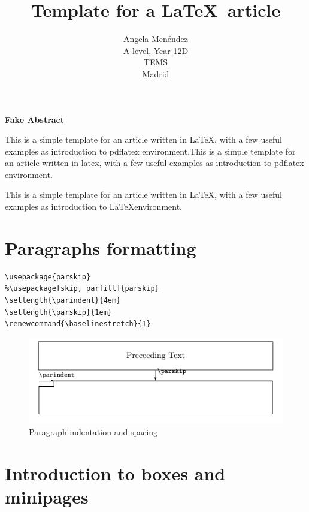 \documentclass[12pt,a4paper]{article}
\title{Template for a \LaTeX\ article}
\author{Angela Menéndez\\
  \small A-level, Year 12D\\
  \small TEMS\\
  \small Madrid
}
\theoremstyle{definition}
\theoremstyle{remark}
\begin{document}
\maketitle




\bigskip 
\begin{center}
\textbf{Fake Abstract}
\end{center}
This is a simple template for an article written in \LaTeX, with a few useful examples as introduction to pdflatex environment.This is a simple template for an article written in latex, with a few useful examples as introduction to pdflatex environment.

This is a simple template for an article written in \LaTeX, with a few useful examples as introduction to \LaTeX environment.

\newpage
\tableofcontents

\newpage
\section{Paragraphs formatting}\label{sec:par_formatting}
\begin{verbatim}
\usepackage{parskip}
%\usepackage[skip, parfill]{parskip}
\setlength{\parindent}{4em}
\setlength{\parskip}{1em}
\renewcommand{\baselinestretch}{1}
\end{verbatim}

\begin{figure}[H]
\centering
\includegraphics[scale=0.7]{./figs/Paragraph-layout.png}
\caption{Paragraph indentation and spacing}
\end{figure}



\section{Introduction to boxes and minipages}
\end{document}
